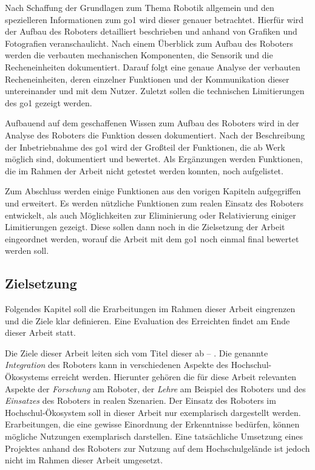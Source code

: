 Nach Schaffung der Grundlagen zum Thema Robotik allgemein und den spezielleren Informationen zum \gls{go1} wird dieser
genauer betrachtet.
Hierfür wird der Aufbau des Roboters detailliert beschrieben und anhand von Grafiken und Fotografien veranschaulicht.
Nach einem Überblick zum Aufbau des Roboters werden die verbauten mechanischen Komponenten, die Sensorik und die Recheneinheiten
dokumentiert.
Darauf folgt eine genaue Analyse der verbauten Recheneinheiten, deren einzelner Funktionen und der Kommunikation dieser
untereinander und mit dem Nutzer.
Zuletzt sollen die technischen Limitierungen des \gls{go1} gezeigt werden.

Aufbauend auf dem geschaffenen Wissen zum Aufbau des Roboters wird in der Analyse des Roboters die Funktion dessen
dokumentiert.
Nach der Beschreibung der Inbetriebnahme des \gls{go1} wird der Großteil der Funktionen, die ab Werk möglich sind,
dokumentiert und bewertet.
Als Ergänzungen werden Funktionen, die im Rahmen der Arbeit nicht getestet werden konnten, noch aufgelistet.

Zum Abschluss werden einige Funktionen aus den vorigen Kapiteln aufgegriffen und erweitert.
Es werden nützliche Funktionen zum realen Einsatz des Roboters entwickelt, als auch Möglichkeiten zur Eliminierung oder
Relativierung einiger Limitierungen gezeigt.
Diese sollen dann noch in die Zielsetzung der Arbeit eingeordnet werden, worauf die Arbeit mit dem \gls{go1} noch einmal
final bewertet werden soll.

\subsection{Zielsetzung}
\label{subsec:zielsetzung}

Folgendes Kapitel soll die Erarbeitungen im Rahmen dieser Arbeit eingrenzen und die Ziele klar definieren.
Eine Evaluation des Erreichten findet am Ende dieser Arbeit statt.


Die Ziele dieser Arbeit leiten sich vom Titel dieser ab -- \emph{\mytitle}.
Die genannte \emph{Integration} des Roboters kann in verschiedenen Aspekte des Hochschul-Ökosystems erreicht werden.
Hierunter gehören die für diese Arbeit relevanten Aspekte der \emph{Forschung} am Roboter, der \emph{Lehre} am Beispiel des Roboters und des \emph{Einsatzes} des Roboters in realen Szenarien.
Der Einsatz des Roboters im Hochschul-Ökosystem soll in dieser Arbeit nur exemplarisch dargestellt werden.
Erarbeitungen, die eine gewisse Einordnung der Erkenntnisse bedürfen, können mögliche Nutzungen exemplarisch darstellen.
Eine tatsächliche Umsetzung eines Projektes anhand des Roboters zur Nutzung auf dem Hochschulgelände ist jedoch nicht
im Rahmen dieser Arbeit umgesetzt.


